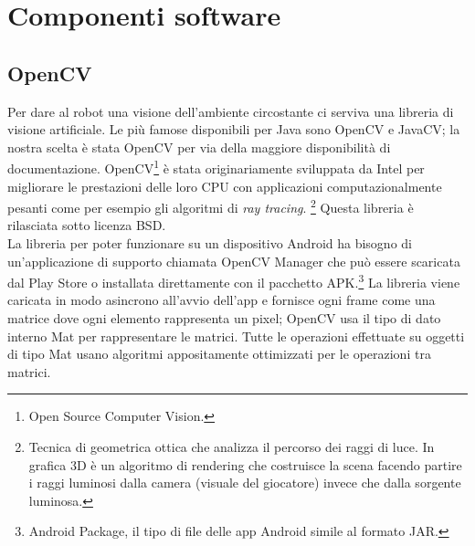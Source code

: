 \chapter{Componenti software}
\fancyfoot[C]{\thepage } 
\section {OpenCV}
Per dare al robot una visione dell'ambiente circostante ci serviva una libreria di 
visione artificiale. Le più famose disponibili per Java sono OpenCV e JavaCV; 
la nostra scelta è stata OpenCV per via della maggiore disponibilità di documentazione. 
OpenCV\footnote{Open Source Computer Vision.} è stata originariamente sviluppata 
da Intel per migliorare le prestazioni delle loro CPU con applicazioni
computazionalmente pesanti come per esempio gli algoritmi di \textit{ray tracing}.
\footnote{Tecnica di geometrica ottica che analizza il percorso dei raggi di luce.
In grafica 3D è un algoritmo di rendering che costruisce la scena facendo
partire i raggi luminosi dalla camera (visuale del giocatore) invece che dalla 
sorgente luminosa.\cite{ray_tracing}} Questa libreria è rilasciata sotto licenza BSD. 
\\La libreria per poter funzionare su un 
dispositivo Android ha bisogno di un'applicazione di supporto chiamata OpenCV 
Manager che può essere scaricata dal Play Store o installata direttamente con il
pacchetto APK.\footnote{Android Package, il tipo di file delle app Android simile 
al formato JAR.} La libreria viene caricata in modo asincrono all'avvio dell'app
e fornisce ogni frame come una matrice dove ogni elemento rappresenta un pixel; 
OpenCV usa il tipo di dato interno Mat per rappresentare le matrici.
Tutte le operazioni effettuate su oggetti di tipo Mat usano algoritmi appositamente 
ottimizzati per le operazioni tra matrici. 


